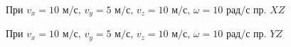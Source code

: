 \documentclass[a5paper, 10pt]{article}
\theoremstyle{definition}
\theoremstyle{plain}
\theoremstyle{remark}
\begin{document}
\begin{figure}[h]
	           \caption{При $v_x = 10 \text{ м/с}, \, v_y = 5  \text{ м/с}, \, v_z = 10  \text{ м/с}, \, \omega = 10 \text{ рад/с}$ пр. $XZ$}
\end{figure}

\begin{figure}[h]
	           \caption{При $v_x = 10 \text{ м/с}, \, v_y = 5  \text{ м/с}, \, v_z = 10  \text{ м/с}, \, \omega = 10 \text{ рад/с}$ пр. $YZ$}
\end{figure}
\end{document}
